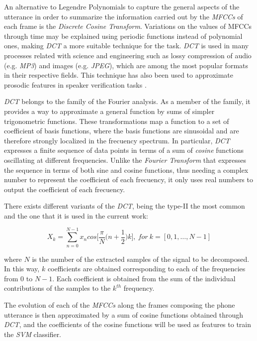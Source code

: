 An alternative to Legendre Polynomials to capture the general aspects of the utterance in order to
summarize the information carried out by the \textit{MFCCs} of each frame is the
\textit{Discrete Cosine Transform}. Variations on the values of MFCCs through time may be explained
using periodic functions instead of polynomial ones, making \textit{DCT} a more suitable technique
for the task. \textit{DCT} is used in many processes related with science and engineering
such as lossy compression of audio (e.g. \textit{MP3}) and images (e.g. \textit{JPEG}), which are
among the most popular formats in their respective fields. This technique has also been used
to approximate prosodic features in speaker verification tasks \cite{dct}.

\textit{DCT} belongs to the family of the Fourier analysis. As a member of the family, it
provides a way to approximate a general function by sums of simpler trigonometric functions.
These transformations map a function to a set of coefficient of basis functions, where
the basis functions are sinusoidal and are therefore strongly localized in the frecuency spectrum.
In particular, \textit{DCT} expresses a finite sequence of data points in terms of a sum of
\textit{cosine} functions oscillating at different frequencies. Unlike the
\textit{Fourier Transform} that expresses the sequence in terms of both sine and cosine functions,
thus needing a complex number to represent the coefficient of each frecuency, it only uses real
numbers to output the coefficient of each frecuency.

There exists different variants of the \textit{DCT}, being the type-II
the most common and the one that it is used in the current work:

\begin{equation}
X_{k} = \sum_{n=0}^{N-1} x_{n} cos \Big[ \frac{\pi}{N} \Big( n + \frac{1}{2} \Big) k \Big], \ for \ k = [0, 1, \dotsc, N-1]
\end{equation}

where $N$ is the number of the extracted samples of the signal to be decomposed.
In this way, $k$ coefficients are obtained corresponding to each of the frequencies from
$0$ to $N-1$. Each coefficient is obtained from the sum of the individual contributions
of the samples to the $k^{th}$ frequency.

The evolution of each of the \textit{MFCCs} along the frames composing the phone utterance is
then approximated by a sum of cosine functions obtained through \textit{DCT}, and the
coefficients of the cosine functions will be used as features to train the \textit{SVM} classifier.
